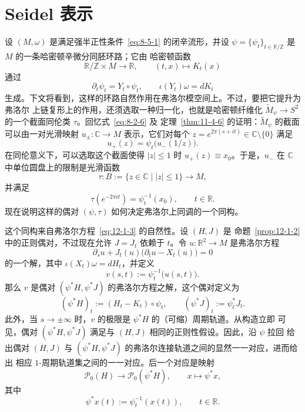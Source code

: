 
\section{Seidel 表示}\label{sec:12-5}

设 $(M,\omega)$ 是满足强半正性条件~\eqref{eq:8-5-1} 的闭辛流形，并设
$\psi=\{\psi_t\}_{t\in\mathbb R/\mathbb Z}$ 是 $M$ 的一条哈密顿辛微分同胚环路；它由
哈密顿函数
\[
  \mathbb R/\mathbb Z\times M\longrightarrow\mathbb R,
  \qquad(t,x)\longmapsto K_t(x)
\]
通过
\begin{equation}\label{eq:12-5-1}
  \partial_t\psi_t=Y_t\circ\psi_t,
  \qquad \iota(Y_t)\omega=dK_t
\end{equation}
生成。下文将看到，这样的环路自然作用在弗洛尔模空间上。不过，要把它提升为弗洛尔
上链复形上的作用，还须选取一种归一化，也就是哈密顿纤维化
$\widetilde M_\psi\to S^2$ 的一个截面同伦类 $\tau$。回忆式~\eqref{eq:8-2-6} 及
定理~\ref{thm:11-4-6} 的证明：$\widetilde M_\psi$ 的截面可以由一对光滑映射
$u_\pm:\mathbb C\to M$ 表示，它们对每个
$z=e^{2\pi(s+it)}\in\mathbb C\setminus\{0\}$ 满足
\[
  u_+(z)=\psi_t\bigl(u_-(1/z)\bigr).
\]
在同伦意义下，可以选取这个截面使得 $|z|\leq1$ 时 $u_+(z)\equiv x_0$。于是，$u_-$ 在
$\mathbb C$ 中单位圆盘上的限制是光滑函数
\[
  \tau:B:=\{z\in\mathbb C\mid |z|\leq1\}\longrightarrow M,
\]
并满足
\begin{equation}\label{eq:12-5-2}
  \tau(e^{-2\pi it})=\psi_t^{-1}(x_0),
  \qquad t\in\mathbb R.
\end{equation}
现在说明这样的偶对 $(\psi,\tau)$ 如何决定弗洛尔上同调的一个同构。

这个同构来自弗洛尔方程~\eqref{eq:12-1-3} 的自然性。设 $(H,J)$ 是
命题~\ref{prop:12-1-2} 中的正则偶对，不过现在允许 $J=J_t$ 依赖于 $t$。令
$u:\mathbb R^2\to M$ 是弗洛尔方程
\[
  \partial_su+J_t(u)\bigl(\partial_tu-X_t(u)\bigr)=0
\]
的一个解，其中 $\iota(X_t)\omega=dH_t$，并定义
\[
  v(s,t):=\psi_t^{-1}\bigl(u(s,t)\bigr).
\]
那么 $v$ 是偶对 $(\psi^*H,\psi^*J)$ 的弗洛尔方程之解，这个偶对定义为
\begin{equation}\label{eq:12-5-3}
  (\psi^*H)_t:=(H_t-K_t)\circ\psi_t,
  \qquad
  (\psi^*J)_t:=\psi_t^*J_t.
\end{equation}
此外，当 $s\to\pm\infty$ 时，$v$ 的极限是 $\psi^*H$ 的（可缩）周期轨道。从构造立即
可见，偶对 $(\psi^*H,\psi^*J)$ 满足与 $(H,J)$ 相同的正则性假设。因此，沿 $\psi$ 拉回
给出偶对 $(H,J)$ 与 $(\psi^*H,\psi^*J)$ 的弗洛尔连接轨道之间的显然一一对应，进而给出
相应 $1$-周期轨道集之间的一一对应。后一个对应是映射
\[
  \mathcal P_0(H)\longrightarrow\mathcal P_0(\psi^*H),
  \qquad x\longmapsto\psi^*x,
\]
其中
\[
  \psi^*x(t):=\psi_t^{-1}(x(t)),
  \qquad t\in\mathbb R.
\]

